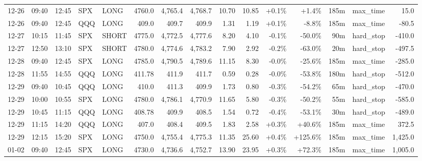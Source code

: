 \documentclass[11pt,a4paper,twoside]{article}
\begin{document}
\begin{landscape}
\begin{center}
\begin{longtable}{>{\color{txtmain}}l l l l l r r r r r r r r >{\color{txtmain}}l r}
12-26 & 09:40 & 12:45 & SPX & LONG & 4760.0 & 4,765.4 & 4,768.7 & 10.70 & 10.85 & \textcolor{wingreen}{+0.1\%} & \textcolor{wingreen}{+1.4\%} & 185m & max\_time & \textcolor{wingreen}{15.0} \\
12-26 & 09:40 & 12:45 & QQQ & LONG & 409.0 & 409.7 & 409.9 & 1.31 & 1.19 & \textcolor{wingreen}{+0.1\%} & \textcolor{lossred}{-8.8\%} & 185m & max\_time & \textcolor{lossred}{-80.5} \\
12-27 & 10:15 & 11:45 & SPX & SHORT & 4775.0 & 4,772.5 & 4,777.6 & 8.20 & 4.10 & \textcolor{lossred}{-0.1\%} & \textcolor{lossred}{-50.0\%} & 90m & hard\_stop & \textcolor{lossred}{-410.0} \\
12-27 & 12:50 & 13:10 & SPX & SHORT & 4780.0 & 4,774.6 & 4,783.2 & 7.90 & 2.92 & \textcolor{lossred}{-0.2\%} & \textcolor{lossred}{-63.0\%} & 20m & hard\_stop & \textcolor{lossred}{-497.5} \\
12-28 & 09:40 & 12:45 & SPX & LONG & 4785.0 & 4,790.5 & 4,789.6 & 11.15 & 8.30 & \textcolor{lossred}{-0.0\%} & \textcolor{lossred}{-25.6\%} & 185m & max\_time & \textcolor{lossred}{-285.0} \\
12-28 & 11:55 & 14:55 & QQQ & LONG & 411.78 & 411.9 & 411.7 & 0.59 & 0.28 & \textcolor{lossred}{-0.0\%} & \textcolor{lossred}{-53.8\%} & 180m & hard\_stop & \textcolor{lossred}{-512.0} \\
12-29 & 09:40 & 10:45 & QQQ & LONG & 410.0 & 411.3 & 409.9 & 1.73 & 0.80 & \textcolor{lossred}{-0.3\%} & \textcolor{lossred}{-54.2\%} & 65m & hard\_stop & \textcolor{lossred}{-470.0} \\
12-29 & 10:00 & 10:55 & SPX & LONG & 4780.0 & 4,786.1 & 4,770.9 & 11.65 & 5.80 & \textcolor{lossred}{-0.3\%} & \textcolor{lossred}{-50.2\%} & 55m & hard\_stop & \textcolor{lossred}{-585.0} \\
12-29 & 10:45 & 11:15 & QQQ & LONG & 408.78 & 409.9 & 408.5 & 1.54 & 0.72 & \textcolor{lossred}{-0.4\%} & \textcolor{lossred}{-53.1\%} & 30m & hard\_stop & \textcolor{lossred}{-489.0} \\
12-29 & 11:15 & 14:20 & QQQ & LONG & 407.0 & 408.4 & 409.5 & 1.83 & 2.58 & \textcolor{wingreen}{+0.3\%} & \textcolor{wingreen}{+40.6\%} & 185m & max\_time & \textcolor{wingreen}{372.5} \\
12-29 & 12:15 & 15:20 & SPX & LONG & 4750.0 & 4,755.4 & 4,775.3 & 11.35 & 25.60 & \textcolor{wingreen}{+0.4\%} & \textcolor{wingreen}{+125.6\%} & 185m & max\_time & \textcolor{wingreen}{1,425.0} \\
01-02 & 09:40 & 12:45 & SPX & LONG & 4730.0 & 4,736.6 & 4,752.7 & 13.90 & 23.95 & \textcolor{wingreen}{+0.3\%} & \textcolor{wingreen}{+72.3\%} & 185m & max\_time & \textcolor{wingreen}{1,005.0} \\

\end{longtable}
\end{center}
\end{landscape}
\end{document}
